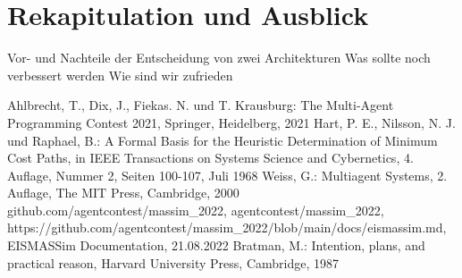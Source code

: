 \documentclass[runningheads]{llncs}
\begin{document}
\section{Rekapitulation und Ausblick}
Vor- und Nachteile der Entscheidung von zwei Architekturen
Was sollte noch verbessert werden
Wie sind wir zufrieden


%
%
%
% 
% 
%
\begin{thebibliography}{8}
	Ahlbrecht, T., Dix, J., Fiekas. N. und T. Krausburg: The Multi-Agent Programming Contest 2021, Springer, Heidelberg, 2021
	Hart, P. E., Nilsson, N. J. und Raphael, B.: A Formal Basis for the Heuristic Determination of Minimum Cost Paths, in IEEE Transactions on Systems Science and Cybernetics, 4. Auflage, Nummer 2, Seiten 100-107, Juli 1968
	Weiss, G.: Multiagent Systems, 2. Auflage, The MIT Press, Cambridge, 2000
	github.com/agentcontest/massim\_2022, agentcontest/massim\_2022, \\ https://github.com/agentcontest/massim\_2022/blob/main/docs/eismassim.md, EISMASSim Documentation, 21.08.2022
	Bratman, M.: Intention, plans, and practical reason, Harvard University Press, Cambridge, 1987
\end{thebibliography}
\end{document}
